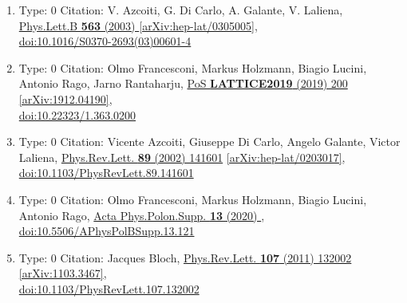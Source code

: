 \documentclass[a4paper,10pt]{article}
\begin{document}
\begin{enumerate}
\begin{enumerate}
  \item Type: 0 Citation: V. Azcoiti, G. Di Carlo, A. Galante, V. Laliena, \href{https://www.doi.org/10.1016/S0370-2693(03)00601-4}{Phys.Lett.B {\bf 563} (2003) }  \href{https://arxiv.org/abs/hep-lat/0305005}{[arXiv:hep-lat/0305005]},\\\href{https://www.doi.org/10.1016/S0370-2693(03)00601-4}{doi:10.1016/S0370-2693(03)00601-4}
  \item Type: 0 Citation: Olmo Francesconi, Markus Holzmann, Biagio Lucini, Antonio Rago, Jarno Rantaharju, \href{https://www.doi.org/10.22323/1.363.0200}{PoS {\bf LATTICE2019} (2019) 200}  \href{https://arxiv.org/abs/1912.04190}{[arXiv:1912.04190]},\\\href{https://www.doi.org/10.22323/1.363.0200}{doi:10.22323/1.363.0200}
  \item Type: 0 Citation: Vicente Azcoiti, Giuseppe Di Carlo, Angelo Galante, Victor Laliena, \href{https://www.doi.org/10.1103/PhysRevLett.89.141601}{Phys.Rev.Lett. {\bf 89} (2002) 141601}  \href{https://arxiv.org/abs/hep-lat/0203017}{[arXiv:hep-lat/0203017]},\\\href{https://www.doi.org/10.1103/PhysRevLett.89.141601}{doi:10.1103/PhysRevLett.89.141601}
  \item Type: 0 Citation: Olmo Francesconi, Markus Holzmann, Biagio Lucini, Antonio Rago, \href{https://www.doi.org/10.5506/APhysPolBSupp.13.121}{Acta Phys.Polon.Supp. {\bf 13} (2020) },\\\href{https://www.doi.org/10.5506/APhysPolBSupp.13.121}{doi:10.5506/APhysPolBSupp.13.121}
  \item Type: 0 Citation: Jacques Bloch, \href{https://www.doi.org/10.1103/PhysRevLett.107.132002}{Phys.Rev.Lett. {\bf 107} (2011) 132002}  \href{https://arxiv.org/abs/1103.3467}{[arXiv:1103.3467]},\\\href{https://www.doi.org/10.1103/PhysRevLett.107.132002}{doi:10.1103/PhysRevLett.107.132002}

\end{enumerate}
\end{enumerate}
\end{document}
